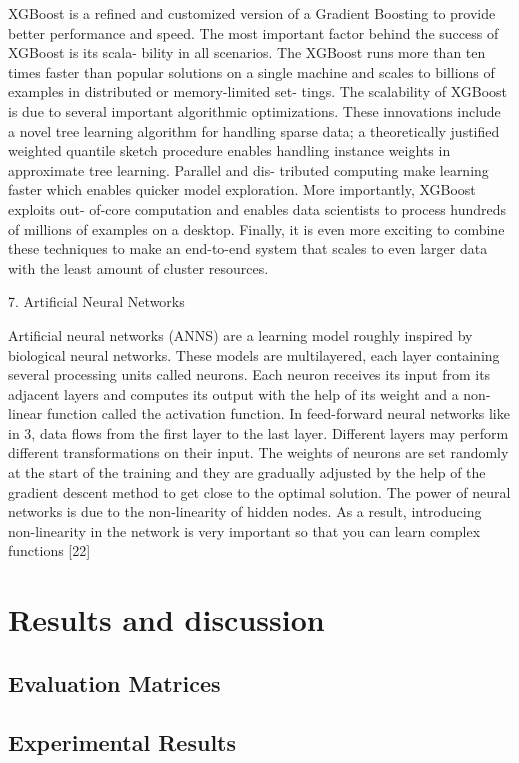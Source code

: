 \documentclass[final]{cvpr}
\begin{document}
XGBoost is a refined and customized version of a Gradient
Boosting to provide better performance and speed. The most
important factor behind the success of XGBoost is its scala-
bility in all scenarios. The XGBoost runs more than ten times
faster than popular solutions on a single machine and scales
to billions of examples in distributed or memory-limited set-
tings. The scalability of XGBoost is due to several important
algorithmic optimizations. These innovations include a novel
tree learning algorithm for handling sparse data; a theoretically
justified weighted quantile sketch procedure enables handling
instance weights in approximate tree learning. Parallel and dis-
tributed computing make learning faster which enables quicker
model exploration. More importantly, XGBoost exploits out-
of-core computation and enables data scientists to process
hundreds of millions of examples on a desktop. Finally, it
is even more exciting to combine these techniques to make
an end-to-end system that scales to even larger data with the
least amount of cluster resources.

7. Artificial Neural Networks

Artificial neural networks (ANNS) are a learning model
roughly inspired by biological neural networks. These models
are multilayered, each layer containing several processing
units called neurons. Each neuron receives its input from
its adjacent layers and computes its output with the help
of its weight and a non-linear function called the activation
function. In feed-forward neural networks like in 3, data flows
from the first layer to the last layer. Different layers may
perform different transformations on their input. The weights
of neurons are set randomly at the start of the training and
they are gradually adjusted by the help of the gradient descent
method to get close to the optimal solution. The power of
neural networks is due to the non-linearity of hidden nodes.
As a result, introducing non-linearity in the network is very
important so that you can learn complex functions [22]
\section{Results and discussion}

\subsection{Evaluation Matrices}

\subsection{Experimental Results}
\end{document}
